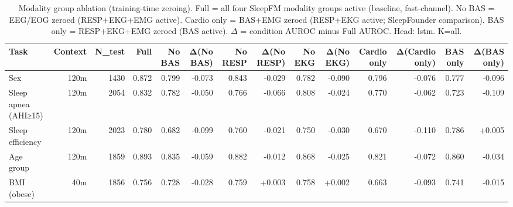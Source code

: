 \begin{table}[ht]
\centering
\caption{Modality group ablation (training-time zeroing). Full = all four SleepFM modality groups active (baseline, fast-channel). No BAS = EEG/EOG zeroed (RESP+EKG+EMG active). Cardio only = BAS+EMG zeroed (RESP+EKG active; SleepFounder comparison). BAS only = RESP+EKG+EMG zeroed (BAS active). $\Delta$ = condition AUROC minus Full AUROC. Head: lstm. K=all.}
\label{tab:modality_ablation}
\begin{tabular}{lrrrrrrrrrrrrr}
\toprule
Task & Context & N_test & Full & No BAS & Δ(No BAS) & No RESP & Δ(No RESP) & No EKG & Δ(No EKG) & Cardio only & Δ(Cardio only) & BAS only & Δ(BAS only) \\
\midrule
Sex & 120m & 1430 & 0.872 & 0.799 & -0.073 & 0.843 & -0.029 & 0.782 & -0.090 & 0.796 & -0.076 & 0.777 & -0.096 \\
Sleep apnea (AHI≥15) & 120m & 2054 & 0.832 & 0.782 & -0.050 & 0.766 & -0.066 & 0.808 & -0.024 & 0.770 & -0.062 & 0.723 & -0.109 \\
Sleep efficiency & 120m & 2023 & 0.780 & 0.682 & -0.099 & 0.760 & -0.021 & 0.750 & -0.030 & 0.670 & -0.110 & 0.786 & +0.005 \\
Age group & 120m & 1859 & 0.893 & 0.835 & -0.059 & 0.882 & -0.012 & 0.868 & -0.025 & 0.821 & -0.072 & 0.860 & -0.034 \\
BMI (obese) & 40m & 1856 & 0.756 & 0.728 & -0.028 & 0.759 & +0.003 & 0.758 & +0.002 & 0.663 & -0.093 & 0.741 & -0.015 \\
\bottomrule
\end{tabular}
\end{table}